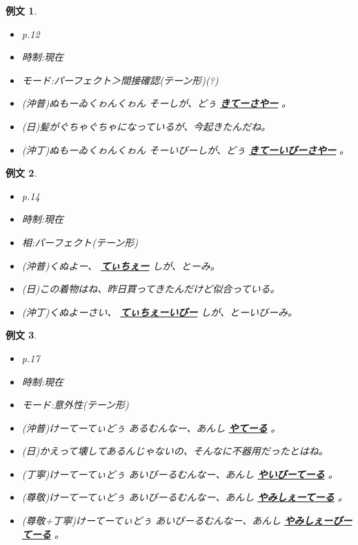 \documentclass[a4j,12pt]{jarticle}
\theoremstyle{break}
\newtheorem{example}{例文}
\newcommand{\highlight}[1]{
  \textbf{\underline{#1}}
}
\begin{document}
\begin{example}
  \begin{itemize}
  \item p.12
  \item 時制:現在
  \item モード:パーフェクト＞間接確認(テーン形)(?)
  \item (沖普)ぬもーゐくゎんくゎん そーしが、どぅ\highlight{きてーさやー}。
  \item (日)髪がぐちゃぐちゃになっているが、今起きたんだね。
  \item (沖丁)ぬもーゐくゎんくゎん そーいびーしが、どぅ\highlight{きてーいびーさやー}。
  \end{itemize}
\end{example}
\begin{example}
  \begin{itemize}
  \item p.14
  \item 時制:現在
  \item 相:パーフェクト(テーン形)
  \item (沖普)くぬよー、\highlight{てぃちぇー}しが、とーみ。
  \item (日)この着物はね、昨日買ってきたんだけど似合っている。
  \item (沖丁)くぬよーさい、\highlight{てぃちぇーいびー}しが、とーいびーみ。
  \end{itemize}
\end{example}
\begin{example}
  \begin{itemize}
    \item p.17
    \item 時制:現在
    \item モード:意外性(テーン形)
    \item (沖普)けーてーてぃどぅ あるむんなー、あんし\highlight{やてーる}。
    \item (日)かえって壊してあるんじゃないの、そんなに不器用だったとはね。
    \item (丁寧)けーてーてぃどぅ あいびーるむんなー、あんし\highlight{やいびーてーる}。
    \item (尊敬)けーてーてぃどぅ あいびーるむんなー、あんし\highlight{やみしぇーてーる}。
    \item (尊敬+丁寧)けーてーてぃどぅ あいびーるむんなー、あんし\highlight{やみしぇーびーてーる}。
  \end{itemize}
\end{example}
\end{document}
